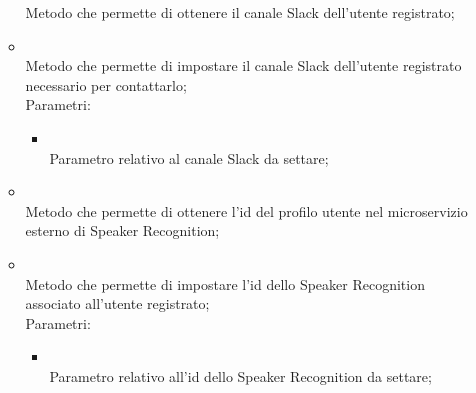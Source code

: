 \begin{itemize}
\begin{itemize}
		Metodo che permette di ottenere il canale Slack dell'utente registrato;\\
		\item[]  \\
		Metodo che permette di impostare il canale Slack dell'utente registrato necessario per contattarlo;\\
		Parametri:
		\begin{itemize}
			\item {} \\
			Parametro relativo al canale Slack da settare;
		\end{itemize}
		\item[]  \\
		Metodo che permette di ottenere l'id del profilo utente nel microservizio esterno di Speaker Recognition;\\
		\item[]  \\
		Metodo che permette di impostare l'id dello Speaker Recognition associato all'utente registrato;\\
		Parametri:
		\begin{itemize}
			\item {} \\
			Parametro relativo all'id dello Speaker Recognition da settare;
		\end{itemize}
	\end{itemize}
\end{itemize}

